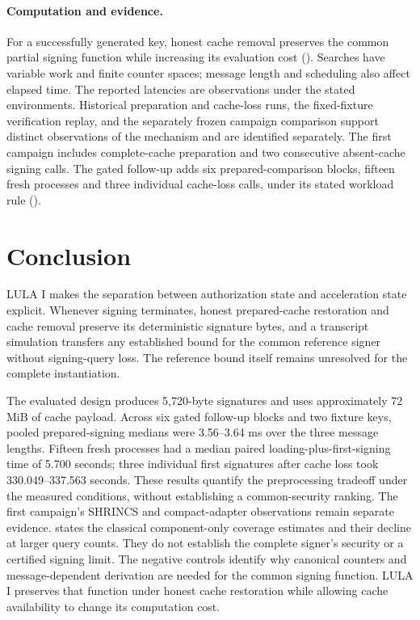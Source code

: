 \documentclass[a4paper,envcountsame,runningheads]{llncs}
\begin{document}
\paragraph{Computation and evidence.}
For a successfully generated key, honest cache removal preserves the common partial signing function while increasing its evaluation cost (). Searches have variable work and finite counter spaces; message length and scheduling also affect elapsed time. The reported latencies are observations under the stated environments. Historical preparation and cache-loss runs, the fixed-fixture verification replay, and the separately frozen campaign comparison support distinct observations of the mechanism and are identified separately. The first campaign includes complete-cache preparation and two consecutive absent-cache signing calls. The gated follow-up adds six prepared-comparison blocks, fifteen fresh processes and three individual cache-loss calls, under its stated workload rule ().

\section{Conclusion}\label{sec:conclusion}
LULA I makes the separation between authorization state and acceleration state explicit. Whenever signing terminates, honest prepared-cache restoration and cache removal preserve its deterministic signature bytes, and a transcript simulation transfers any established bound for the common reference signer without signing-query loss. The reference bound itself remains unresolved for the complete instantiation.

The evaluated design produces 5,720-byte signatures and uses approximately 72 MiB of cache payload. Across six gated follow-up blocks and two fixture keys, pooled prepared-signing medians were 3.56--3.64 ms over the three message lengths. Fifteen fresh processes had a median paired loading-plus-first-signing time of 5.700 seconds; three individual first signatures after cache loss took 330.049--337.563 seconds. These results quantify the preprocessing tradeoff under the measured conditions, without establishing a common-security ranking. The first campaign's SHRINCS and compact-adapter observations remain separate evidence.  states the classical component-only coverage estimates and their decline at larger query counts. They do not establish the complete signer's security or a certified signing limit. The negative controls identify why canonical counters and message-dependent derivation are needed for the common signing function. LULA I preserves that function under honest cache restoration while allowing cache availability to change its computation cost.
\end{document}
